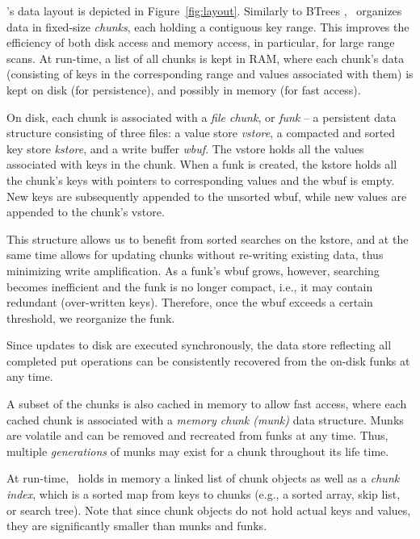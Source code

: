 \sys's data layout is depicted in Figure~\ref{fig:layout}.
Similarly to BTrees , 
\sys\ organizes data in fixed-size \emph{chunks}, each holding a contiguous key range.
This improves the efficiency of both disk access and memory access, in particular, for large range scans. 
At run-time, a list of all chunks is kept in RAM, where each chunk's data 
(consisting of keys in the corresponding range and values associated with them) 
is kept on disk (for persistence), and possibly in memory (for fast access). 

On disk, each chunk is associated with a \emph{file chunk}, or \emph{funk} --
a persistent data structure consisting of three files:  a value store \emph{vstore}, 
a compacted and sorted  key store \emph{kstore}, and a write buffer \emph{wbuf}. The vstore holds all the values associated with keys
in the chunk. When a funk is created, the kstore holds all the chunk's keys with pointers to corresponding values and the wbuf is empty.
New keys are subsequently appended to the unsorted wbuf, while new values are appended to the chunk's vstore.

This structure allows us to benefit from sorted searches on the kstore, and at the same time
allows for updating chunks without re-writing existing data, thus minimizing write amplification.
As a funk's wbuf grows, however, searching becomes inefficient   and  
the funk is no longer compact, i.e., it may contain redundant (over-written keys).
Therefore, once the wbuf exceeds a certain threshold, we reorganize the funk.

Since updates to disk are executed synchronously,  the data store reflecting all completed put operations 
can be consistently recovered from the on-disk funks at any time. 

A subset of the chunks is also cached in memory to allow fast access, where each cached chunk is associated with a
\emph{memory chunk (munk)}  data structure. 
Munks are volatile and can be removed and recreated from funks at any time.
Thus, multiple \emph{generations} of munks may exist for a chunk throughout its life time.


At run-time, \sys\ holds in memory a linked list of chunk objects as well as 
a \emph{chunk index}, which is a sorted map from keys to chunks (e.g., a sorted array, skip list, or search tree).
Note that since chunk objects do not hold actual keys and values, they are significantly smaller than munks and funks. 


